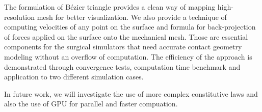 \documentclass{egpubl}
\begin{document}
The formulation of B\'ezier triangle provides
a clean way of mapping high-resolution mesh for better
visualization. We also provide a technique of computing velocities of any point
on the surface and formula for back-projection of forces applied on the
surface onto the mechanical mesh. 
Those are essential components for the surgical simulators that need accurate contact geometry modeling without an overflow of computation.
The efficiency of the approach is demonstrated through convergence tests,  computation time benchmark and application to two different  simulation cases.

In future work, we will investigate the use of more complex constitutive laws and also the use of GPU for parallel and faster compuation.



%



\end{document}
